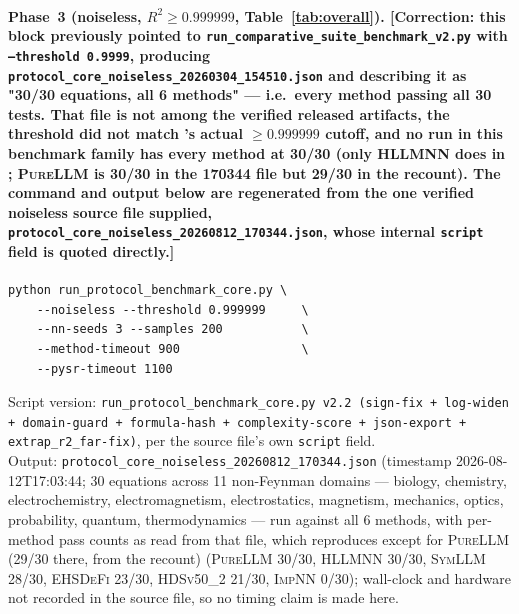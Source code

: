 \documentclass[twoside,11pt]{article}
\newcommand{\PureLLM}{\textsc{PureLLM}}
\newcommand{\INN}{\textsc{ImpNN}}
\newcommand{\EHD}{\textsc{EHSDeFi}}
\newcommand{\HSL}{\textsc{HLLMNN}}
\newcommand{\SEL}{\textsc{SymLLM}}
\newcommand{\HDS}{\textsc{HDSv50\_2}}
\begin{document}
\paragraph{Phase~3 (noiseless, $R^2\geq0.999999$, Table~\ref{tab:overall}).
\textbf{[Correction: this block previously pointed to
\texttt{run\_comparative\_suite\_benchmark\_v2.py} with
\texttt{--threshold 0.9999}, producing
\texttt{protocol\_core\_noiseless\_20260304\_154510.json} and describing it
as "30/30 equations, all 6 methods" --- i.e.\ every method passing all 30
tests. That file is not among the verified released artifacts, the
threshold did not match 's actual $\geq0.999999$ cutoff,
and no run in this benchmark family has every method at 30/30 (only
\HSL{} does in ; \PureLLM{} is 30/30 in the 170344 file but 29/30 in the recount). The command and output
below are regenerated from the one verified noiseless source file supplied,
\texttt{protocol\_core\_noiseless\_20260812\_170344.json}, whose internal
\texttt{script} field is quoted directly.]}}
\begin{verbatim}
python run_protocol_benchmark_core.py \
    --noiseless --threshold 0.999999     \
    --nn-seeds 3 --samples 200           \
    --method-timeout 900                 \
    --pysr-timeout 1100
\end{verbatim}
Script version: \texttt{run\_protocol\_benchmark\_core.py v2.2 (sign-fix +
log-widen + domain-guard + formula-hash + complexity-score + json-export +
extrap\_r2\_far-fix)}, per the source file's own \texttt{script} field.\\
Output: \texttt{protocol\_core\_noiseless\_20260812\_170344.json}
(timestamp 2026-08-12T17:03:44; 30 equations across 11 non-Feynman domains
--- biology, chemistry, electrochemistry, electromagnetism, electrostatics,
magnetism, mechanics, optics, probability, quantum, thermodynamics --- run
against all 6 methods, with per-method pass counts as read from that file, which
\Cref{tab:overall} reproduces except for \PureLLM{} (29/30 there, from the recount) (\PureLLM{} 30/30, \HSL{} 30/30, \SEL{} 28/30, \EHD{}
23/30, \HDS{} 21/30, \INN{} 0/30); wall-clock and hardware not recorded in
the source file, so no timing claim is made here.
\end{document}
